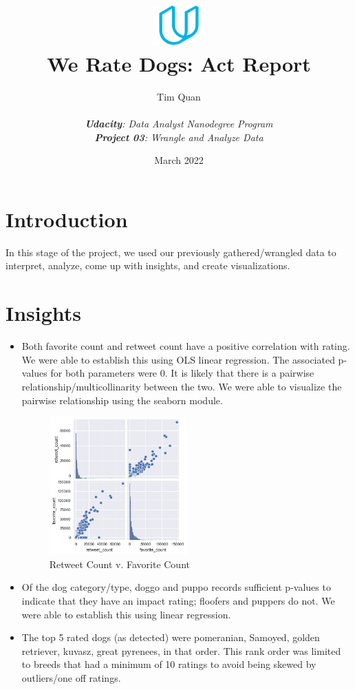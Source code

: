 \documentclass[10pt,a4paper]{article}
\title{\includegraphics[width=2cm]{udacity-logo.png}\\We Rate Dogs: Act Report}
\date{March 2022}
\author{Tim Quan\\ \\ 
	\textit{\textbf{Udacity}: Data Analyst Nanodegree Program}\\ 
	\textit{\textbf{Project 03}: Wrangle and Analyze Data}}
\begin{document}
\maketitle

\section{Introduction}

    In this stage of the project, we used our previously gathered/wrangled data to interpret, analyze, come up with insights,
    and create visualizations.

    \section{Insights}
        \begin{itemize}

            \item Both favorite count and retweet count have a positive correlation with rating. We were able to establish this using OLS linear regression. 
            The associated p-values for both parameters were 0. It is likely that there is a pairwise relationship/multicollinarity between the two. We
            were able to visualize the pairwise relationship using the seaborn module.
            \begin{figure}[htb]
                \centering
                \includegraphics[width=0.5\textwidth]{pairwise.jpg}            
                \caption{Retweet Count v. Favorite Count}
              \end{figure}
            \item Of the dog category/type, doggo and puppo records sufficient p-values to indicate that they have an impact rating; floofers and puppers do not.
            We were able to establish this using linear regression.
            \item The top 5 rated dogs (as detected) were pomeranian, Samoyed, golden retriever, kuvasz, great pyrenees, in that order. This rank order was limited to 
            breeds that had a minimum of 10 ratings to avoid being skewed by outliers/one off ratings.
        \end{itemize}
\end{document}
